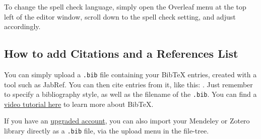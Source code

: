 \documentclass{article}
\begin{document}
To change the spell check language, simply open the Overleaf menu at the top left of the editor window, scroll down to the spell check setting, and adjust accordingly.

\subsection{How to add Citations and a References List}

You can simply upload a \verb|.bib| file containing your BibTeX entries, created with a tool such as JabRef. You can then cite entries from it, like this: \cite{greenwade93}. Just remember to specify a bibliography style, as well as the filename of the \verb|.bib|. You can find a \href{https://www.overleaf.com/help/97-how-to-include-a-bibliography-using-bibtex}{video tutorial here} to learn more about BibTeX.

If you have an \href{https://www.overleaf.com/user/subscription/plans}{upgraded account}, you can also import your Mendeley or Zotero library directly as a \verb|.bib| file, via the upload menu in the file-tree.



\end{document}

